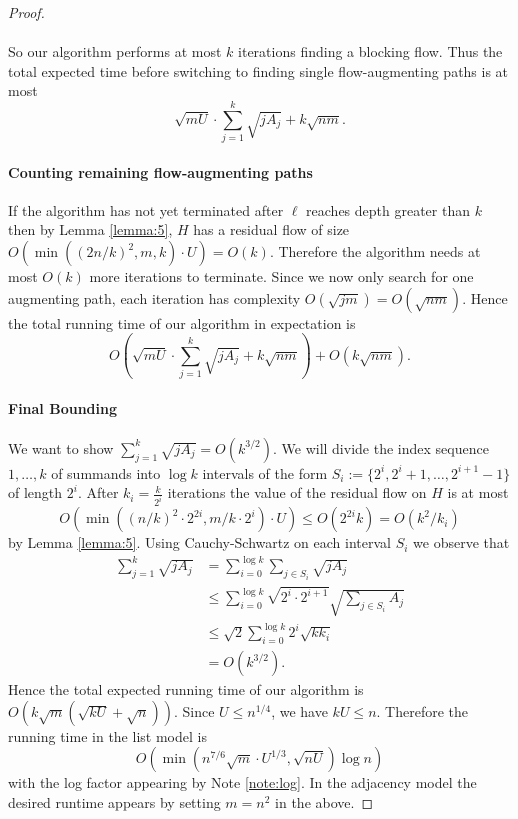 \begin{proof}
\paragraph{}
So our algorithm performs at most $k$ iterations finding a blocking flow. Thus the total expected time before switching to finding single flow-augmenting paths is at most
$$\sqrt{mU}\cdot\sum_{j=1}^k\sqrt{jA_j} + k\sqrt{nm}.$$
\paragraph{Counting remaining flow-augmenting paths}
If the algorithm has not yet terminated after $\ell$ reaches depth greater than $k$ then by Lemma \ref{lemma:5}, $H$ has a residual flow of size $O(\min((2n/k)^2,m,k)\cdot U)=O(k)$. Therefore the algorithm needs at most $O(k)$ more iterations to terminate. Since we now only search for one augmenting path, each iteration has complexity $O(\sqrt{jm}) = O(\sqrt{nm})$. Hence the total running time of our algorithm in expectation is
$$O(\sqrt{mU}\cdot \sum_{j=1}^k\sqrt{jA_j} + k\sqrt{nm}) + O(k\sqrt{nm}).$$
\paragraph{Final Bounding}
We want to show $\sum_{j=1}^k\sqrt{jA_j} = O(k^{3/2})$. We will divide the index sequence $1, \dots, k$ of summands into $\log k$ intervals of the form $S_i := \{2^i, 2^i + 1, \dots, 2^{i+1}-1\}$ of length $2^i$. After $k_i=\frac{k}{2^i}$ iterations the value of the residual flow on $H$ is at most 
$$O(\min((n/k)^2\cdot 2^{2i}, m/k\cdot 2^i)\cdot U) \leq O(2^{2i}k) = O(k^2/k_i)$$
by Lemma \ref{lemma:5}. Using Cauchy-Schwartz on each interval $S_i$ we observe that
\begin{align*}
\sum_{j=1}^k \sqrt{jA_j} &= \sum_{i=0}^{\log k} \sum_{j \in S_i} \sqrt{jA_j}\\
 &\leq \sum_{i=0}^{\log k} \sqrt{2^i\cdot 2^{i+1}}\sqrt{\sum_{j\in S_i} A_j} \\
 &\leq \sqrt{2}\sum_{i=0}^{\log k} 2^i\sqrt{kk_i} \\
 &= O(k^{3/2}).
 \end{align*}
 Hence the total expected running time of our algorithm is $O(k\sqrt{m}(\sqrt{kU} + \sqrt{n}))$. Since $U\leq n^{1/4}$, we have $kU \leq n$. Therefore the running time in the list model is
 $$O(\min(n^{7/6}\sqrt{m}\cdot U^{1/3}, \sqrt{nU})\log n)$$
 with the log factor appearing by Note \ref{note:log}. In the adjacency model the desired runtime appears by setting $m=n^2$ in the above.
\end{proof}

